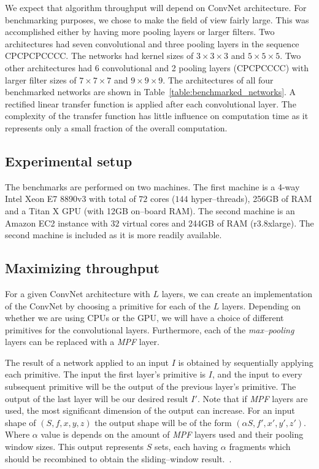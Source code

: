 \documentclass[conference]{./IEEEtran/IEEEtran}
\begin{document}
  We expect that algorithm throughput will depend on ConvNet
  architecture.  For benchmarking purposes, we chose to make the field
  of view fairly large.  This was accomplished either by having more
  pooling layers or larger filters. Two architectures had seven
  convolutional and three pooling layers in the sequence CPCPCPCCCC.
  The networks had kernel sizes of $3\times 3 \times 3$ and $5\times
  5\times 5$.  Two other architectures had 6 convolutional and 2
  pooling layers (CPCPCCCC) with larger filter sizes of $7 \times
  7 \times 7$ and $9 \times 9 \times 9$.  The architectures of all
  four benchmarked networks are shown in
  Table~\ref{table:benchmarked_networks}.  A rectified linear transfer
  function is applied after each convolutional layer.  The complexity
  of the transfer function has little influence on computation
  time as it represents only a small fraction of the overall
  computation.

\subsection{Experimental setup}

  The benchmarks are performed on two machines.  The first machine is
  a 4-way Intel Xeon E7 8890v3 with total of $72$ cores ($144$
  hyper--threads), 256GB of RAM and a Titan X GPU (with 12GB on--board
  RAM).  The second machine is an Amazon EC2 instance with $32$
  virtual cores and 244GB of RAM (r3.8xlarge).  The second machine is
  included as it is more readily available.

\subsection{Maximizing throughput}

  For a given ConvNet architecture with $L$ layers, we can create an
  implementation of the ConvNet by choosing a primitive for each of
  the $L$ layers.  Depending on whether we are using CPUs or the GPU,
  we will have a choice of different primitives for the convolutional
  layers.  Furthermore, each of the \emph{max--pooling} layers can be
  replaced with a \emph{MPF} layer.

  The result of a network applied to an input $I$ is obtained by
  sequentially applying each primitive.  The input the first layer's
  primitive is $I$, and the input to every subsequent primitive will
  be the output of the previous layer's primitive.  The output of the
  last layer will be our desired result $I'$.  Note that if \emph{MPF}
  layers are used, the most significant dimension of the output can
  increase.  For an input shape of $(S,f,x,y,z)$ the output shape will
  be of the form $(\alpha S,f',x',y',z')$.  Where $\alpha$ value is
  depends on the amount of \emph{MPF} layers used and their pooling
  window sizes.  This output represents $S$ sets, each having $\alpha$
  fragments which should be recombined to obtain the sliding--window
  result.~\cite{giusti2013fast,masci2013fast}.
\end{document}
